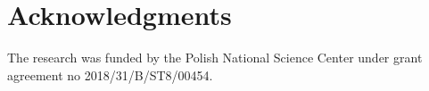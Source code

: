 \documentclass{IOS-Book-Article}
\begin{document}
\section*{Acknowledgments}
The research was funded by the Polish National Science Center under grant agreement no 2018/31/B/ST8/00454.



\end{document}
